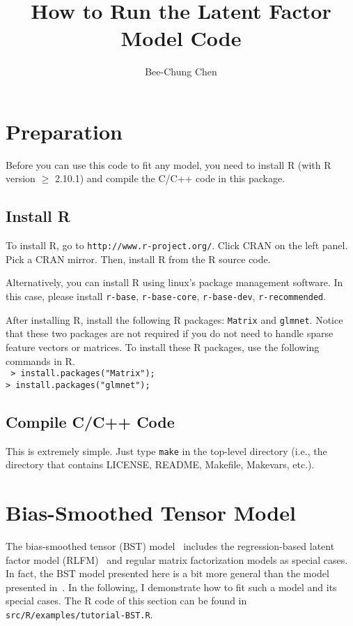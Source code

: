 \documentclass[10pt]{article}
\begin{document}
\title{How to Run the Latent Factor Model Code}
\author{Bee-Chung Chen}
\maketitle

\section{Preparation}

Before you can use this code to fit any model, you need to install R (with R version $\geq$ 2.10.1) and compile the C/C++ code in this package.

\subsection{Install R}

To install R, go to {\tt http://www.r-project.org/}.  Click CRAN on the left panel.  Pick a CRAN mirror.  Then, install R from the R source code.

Alternatively, you can install R using linux's package management software.  In this case, please install {\tt r-base}, {\tt r-base-core}, {\tt r-base-dev}, {\tt r-recommended}.

After installing R, install the following R packages: {\tt Matrix} and {\tt glmnet}.  Notice that these two packages are not required if you do not need to handle sparse feature vectors or matrices.  To install these R packages, use the following commands in R.\\
{\tt
> install.packages("Matrix");\\
> install.packages("glmnet");
}

\subsection{Compile C/C++ Code}

This is extremely simple.  Just type {\tt make} in the top-level directory (i.e., the directory that contains LICENSE, README, Makefile, Makevars, etc.).

\section{Bias-Smoothed Tensor Model}

The bias-smoothed tensor (BST) model~\cite{bst:kdd11} includes the regression-based latent factor model (RLFM)~\cite{rlfm:kdd09} and regular matrix factorization models as special cases.  In fact, the BST model presented here is a bit more general than the model presented in~\cite{bst:kdd11}.  In the following, I demonstrate how to fit such a model and its special cases.  The R code of this section can be found in {\tt src/R/examples/tutorial-BST.R}.
\end{document}
